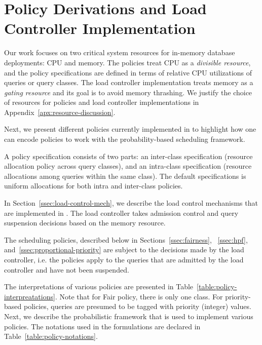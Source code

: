 \section{Policy Derivations and Load Controller Implementation}\label{sec:policy}
Our work focuses on two critical system resources for in-memory database deployments: CPU and memory. 
The policies treat CPU as a \textit{divisible resource}, and the policy specifications are defined in terms of relative CPU utilizations of queries or query classes.
The load controller implementation treats memory as a \textit{gating resource} and its goal is to avoid memory thrashing.
We justify the choice of resources for policies and load controller implementations in Appendix~\ref{apx:resource-discussion}.

Next, we present different policies currently implemented in \sys{} to highlight how one can encode policies to work with the probability-based scheduling framework. 

A policy specification consists of two parts: an inter-class specification (resource allocation policy across query classes), and an intra-class specification (resource allocations among queries within the same class). 
The default specifications is uniform allocations for both intra and inter-class policies. 

In Section~\ref{ssec:load-control-mech}, we describe the load control mechanisms that are implemented in \sys{}. 
The load controller takes admission control and query suspension decisions based on the memory resource.

The scheduling policies, described below in Sections~\ref{ssec:fairness}, ~\ref{ssec:hpf}, and~\ref{ssec:proportional-priority} are subject to the decisions made by the load controller, i.e. the policies apply to the queries that are admitted by the load controller and have not been suspended. %


The interpretations of various policies are presented in Table~\ref{table:policy-interpreatations}.
Note that for Fair policy, there is only one class. 
For priority-based policies, queries are presumed to be tagged with priority (integer) values. 
Next, we describe the probabilistic framework that is used to implement various policies. 
The notations used in the formulations are declared in Table~\ref{table:policy-notations}.


